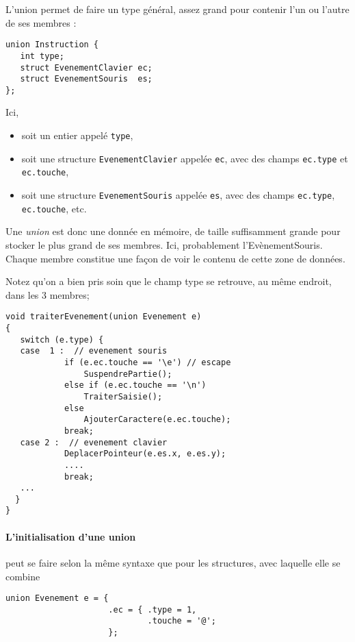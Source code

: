 \documentclass[10pt]{article}
\begin{document}
L'union permet de faire un type général, assez grand pour contenir 
l'un ou l'autre de ses membres :


\begin{verbatim}
union Instruction {
   int type;
   struct EvenementClavier ec;
   struct EvenementSouris  es;
};
\end{verbatim}

Ici, 
\begin{itemize}
\item soit un entier appelé \texttt{type},
\item soit une structure \texttt{EvenementClavier} appelée \texttt{ec},
avec des champs \texttt{ec.type} et  \texttt{ec.touche},
\item soit une structure \texttt{EvenementSouris} appelée \texttt{es},
avec des champs \texttt{ec.type}, \texttt{ec.touche}, etc.
\end{itemize}


Une \emph{union} est donc une donnée en mémoire, de taille suffisamment 
grande pour stocker le plus grand de ses membres. Ici, probablement 
l'EvènementSouris. Chaque membre constitue une façon de voir le contenu de cette zone de données.

Notez qu'on a bien pris soin que le champ type se retrouve, au même endroit,
dans les 3 membres;



\begin{verbatim}
void traiterEvenement(union Evenement e) 
{
   switch (e.type) {
   case  1 :  // evenement souris
            if (e.ec.touche == '\e') // escape
                SuspendrePartie();
            else if (e.ec.touche == '\n')
                TraiterSaisie();
            else 
                AjouterCaractere(e.ec.touche);
            break;
   case 2 :  // evenement clavier
            DeplacerPointeur(e.es.x, e.es.y);
            ....
            break;
   ...
  }
}
\end{verbatim}



 \paragraph{L'initialisation d'une union} peut se faire selon la même syntaxe 
 que pour les structures, avec laquelle elle se combine 



\begin{verbatim}
union Evenement e = { 
                     .ec = { .type = 1,
                             .touche = '@';
                     };
\end{verbatim}
\end{document}
